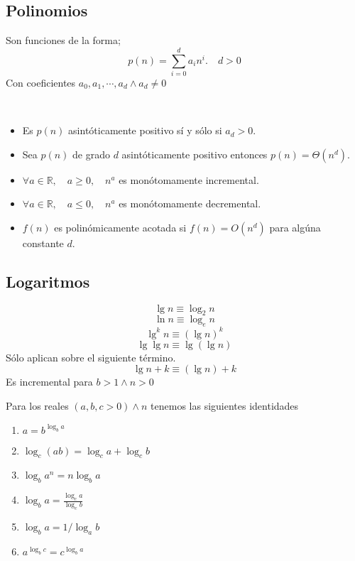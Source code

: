\documentclass[tikz,11pt,fleqn]{book} %
\begin{document}
\subsection{Polinomios}
Son funciones de la forma;
$$
p(n)=\sum_{i=0}^d a_in^i.\quad d>0
$$
Con coeficientes $a_0,a_1, \cdots,a_d\land a_d\neq0$
\begin{theorem}~
    \begin{itemize}
        \item Es $p(n)$ asintóticamente positivo sí y sólo si $a_d>0$.
        \item Sea $p(n)$ de grado $d$ asintóticamente positivo entonces $p(n)=\Theta(n^d)$.
        \item $\forall a\in \mathbb R,\quad a\ge0,\quad n^a$ es monótomamente incremental.
        \item $\forall a\in \mathbb R,\quad a\le0,\quad n^a$ es monótomamente decremental.
        \item $f(n)$ es polinómicamente acotada si $f(n)=O(n^d)$ para algúna constante $d$.
    \end{itemize}
\end{theorem}

\subsection{Logaritmos}
\begin{definition}[Notaciones]
    $$\lg n\equiv \log_2 n$$
    $$\ln n\equiv \log_e n$$
    $$\lg^k n\equiv (\lg n)^k$$
    $$\lg\lg n\equiv \lg(\lg n)$$
    Sólo aplican sobre el siguiente término.
    $$ \lg n+k\equiv (\lg n) +k $$
    Es incremental para $b>1\land n>0$
\end{definition}


\begin{theorem}[Identidades]
    Para los reales $(a,b,c>0)\land n$ tenemos las siguientes identidades
    \begin{enumerate}
        \item $a=b^{\log_ba}$
        \item $\log_c(ab)=\log_ca+\log_cb$
        \item $\log_ba^n=n\log_ba$
        \item $\log_ba=\frac{\log_ca}{\log_cb}$
        \item $\log_ba=1/\log_ab$
        \item $a^{\log_bc}=c^{\log_ba}$
    \end{enumerate}
\end{theorem}
\end{document}
